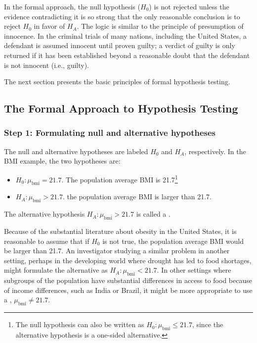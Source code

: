 \begin{spacing}{1.5}
In the formal approach, the null hypothesis ($H_0$) is not rejected unless the evidence contradicting it is so strong that the only reasonable conclusion is to reject $H_0$ in favor of $H_A$. The logic is similar to the principle of presumption of innocence. In the criminal trials of many nations, including the United States, a defendant is assumed innocent until proven guilty; a verdict of guilty is only returned if it has been established beyond a reasonable doubt that the defendant is not innocent (i.e., guilty). 

The next section presents the basic principles of formal hypothesis testing.

\subsection{The Formal Approach to Hypothesis Testing}
\label{formalHypothesisTesting}


\subsubsection{Step 1: Formulating null and alternative hypotheses}

The null and alternative hypotheses are labeled $H_0$ and $H_A$, respectively.  In the BMI example, the two hypotheses are:

\begin{itemize}
	\item $H_0: \mu_{\text{bmi}} = 21.7$. The population average BMI is 21.7\footnote{The null hypothesis can also be written as $H_0: \mu_{\text{bmi}} \leq 21.7$, since the alternative hypothesis is a one-sided alternative.}
	
	\item $H_A: \mu_{\text{bmi}} > 21.7$. the population average BMI is larger than 21.7.
	
\end{itemize}	
The alternative hypothesis $H_A: \mu_{\text{bmi}} > 21.7$ is called a . 

Because of the substantial literature about obesity in the United States, it is reasonable to assume that if $H_0$ is not true, the population average BMI would be larger than 21.7.  An investigator studying a similar problem in another setting, perhaps in the developing world where drought has led to food shortages, might formulate the alternative as $ H_A:\mu_{\text{bmi}} < 21.7$. In other settings where subgroups of the population have  substantial differences in access to food because of income differences, such as India or Brazil, it might be more appropriate to use a , $\mu_{\text{bmi}} \neq 21.7$. 


\end{spacing}
